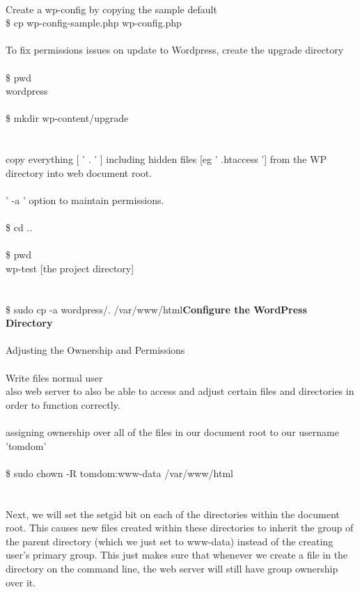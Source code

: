 \documentclass[10pt,a4paper]{article}
\begin{document}
{{{{{{{{{{{{{{{{\\
Create a wp-config by copying the sample default\\
\$ cp wp-config-sample.php wp-config.php\\
\\
To fix permissions issues on update to Wordpress, create the upgrade directory\\
\\
\$ pwd\\
wordpress\\
\\
\$ mkdir wp-content/upgrade\\
\\
\\
copy everything [ ' . ' ] including hidden files [eg ' .htaccess '] from the WP directory into web document root.\\
\\
' -a ' option to maintain permissions.\\
\\
\$ cd ..\\
\\
\$ pwd\\
wp-test   [the project directory]\\
\\
\\
\$ sudo cp -a wordpress/. /var/www/html}{\large \textbf{Configure the WordPress Directory}}{\large \\
\\
Adjusting the Ownership and Permissions\\
\\
Write files normal user\\
also web server to also be able to access and adjust certain files and directories in order to function correctly.\\
\\
assigning ownership over all of the files in our document root to our username 'tomdom'\\
\\
\$ sudo chown -R tomdom:www-data /var/www/html}{\large \\
\\
\\
Next, we will set the setgid bit on each of the directories within the document root. This causes new files created within these directories to inherit the group of the parent directory (which we just set to www-data) instead of the creating user's primary group. This just makes sure that whenever we create a file in the directory on the command line, the web server will still have group ownership over it.\\
}}}}}}}}}}}}}}}}
\end{document}
